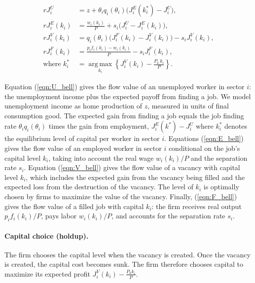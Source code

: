 \documentclass[12pt]{article} %
\theoremstyle{definition}
\begin{document}
\begin{align}
rJ_i^U &= z + \theta_i q_i(\theta_i)\big(J_i^E(k_i^*)-J_i^U\big), \label{eqn:U_bell}\\
rJ_i^E(k_i) &= \frac{w_i(k_i)}{P} + s_i\big(J_i^U-J_i^E(k_i)\big), \label{eqn:E_bell} \\ 
rJ_i^V(k_i) &=  q_i(\theta_i)\big(J_i^F(k_i)-J_i^V(k_i)\big) - s_i J^V_i(k_i), \label{eqn:V_bell}\\
rJ_i^F(k_i) &= \frac{p_i f_i(k_i) - w_i(k_i)}{P} - s_i J_i^F(k_i), 
\label{eqn:F_bell} \\
\text{where }k_i^{*}
&= \operatorname*{arg\,max}_{k_i}\left\{ J_i^{V}(k_i) - \frac{P_k\,k_i}{P} \right\}.
\label{eqn:kstar}
\end{align}

Equation (\ref{eqn:U_bell}) gives the flow value of an unemployed worker  in sector $i$: the unemployment income  plus the expected payoff from   finding a job. We model unemployment income as home production of  $z$,  measured in units of  final consumption good. %
The expected gain from  finding a job equals the job finding rate $\theta_i q_i (\theta_i)$ times the gain from employment, $J_i^E(k^*)-J^U_i$ where $k_i^*$ denotes the equilibrium level of capital per worker in sector $i$. Equations (\ref{eqn:E_bell}) gives the flow value of an employed worker in sector $i$ conditional on the job's capital level $k_i$, taking into account the real wage $w_i(k_i)/P$ and the separation rate $s_i$. Equation (\ref{eqn:V_bell}) gives the flow value of a vacancy with capital level $k_i$, which includes the expected gain from the vacancy being filled and the expected loss from the destruction of the vacancy. The level of $k_i$ is optimally chosen by firms to maximize the value of the vacancy. Finally, (\ref{eqn:F_bell})  gives the flow value of a filled job with capital $k_i$: the firm receives real output $p_if_i(k_i)/P$, pays labor $w_i(k_i)/P$, and accounts for the separation rate $s_i$.





\paragraph{Capital choice (holdup).}
The firm chooses the capital level when the vacancy is created. Once the vacancy is created,  the capital cost becomes sunk. The firm therefore chooses capital to maximize its expected profit $J^V_i(k_i) - \frac{P_kk_i}{P}$.
\end{document}
